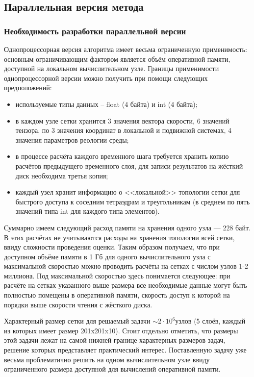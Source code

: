 \subsection{Параллельная версия метода}

\subsubsection{Необходимость разработки параллельной версии}

Однопроцессорная версия алгоритма имеет весьма ограниченную применимость: основным ограничивающим фактором является объём оперативной памяти, доступной на локальном вычислительном узле. Границы применимости однопроцессорной версии можно получить при помощи следующих предположений:
\begin{itemize}
	\item используемые типы данных -- float (4 байта) и int (4 байта);
	\item в каждом узле сетки хранится 3 значения вектора скорости, 6 значений тензора, по 3 значения координат в локальной и подвижной системах, 4 значения параметров реологии среды;
	\item в процессе расчёта каждого временного шага требуется хранить копию расчётов предыдущего временного слоя, для записи результатов на жёсткий диск необходима третья копия;
	\item каждый узел хранит информацию о <<локальной>> топологии сетки для быстрого доступа к соседним тетраэдрам и треугольникам (в среднем по пять значений типа int для каждого типа элементов).
\end{itemize}

Суммарно имеем следующий расход памяти на хранения одного узла — 228 байт. В этих
расчётах не учитываются расходы на хранения топологии всей сетки, ввиду
сложности проведения оценки. Таким образом получаем, что при доступном объёме
памяти в 1 Гб для одного вычислительного узла с максимальной скоростью можно
проводить расчёты на сетках с числом узлов 1-2 миллиона. Под максимальной
скоростью здесь понимается следующее: при расчёте на сетках указанного выше
размера все необходимые данные могут быть полностью помещены в оперативной
памяти, скорость доступ к которой на порядки выше скорости чтения с жёсткого
диска.

Характерный размер сетки для решаемый задачи $\sim 2\cdot 10^6$узлов (5 слоёв,
каждый из которых имеет размер 201x201x10). Стоит
отдельно отметить, что размеры этой задачи лежат на самой нижней границе
характерных размеров задач, решение которых представляет практический интерес.
Поставленную задачу уже весьма проблематично решить на одном вычислительном узле
ввиду ограниченного размера доступной для вычислений оперативной памяти.

